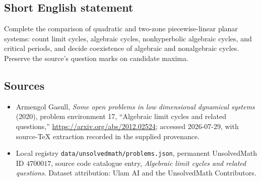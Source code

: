 \documentclass[11pt]{article}
\begin{document}
\subsection{Short English statement}
Complete the comparison of quadratic and two-zone piecewise-linear planar systems: count limit cycles, algebraic cycles, nonhyperbolic algebraic cycles, and critical periods, and decide coexistence of algebraic and nonalgebraic cycles. Preserve the source's question marks on candidate maxima.
\subsection{Sources}
\begin{itemize}
\item Armengol Gasull, \emph{Some open problems in low dimensional dynamical systems} (2020), problem environment 17, ``Algebraic limit cycles and related questions,'' \url{https://arxiv.org/abs/2012.02524}; accessed 2026-07-29, with source-TeX extraction recorded in the supplied provenance.
\item Local registry \texttt{data/unsolvedmath/problems.json}, permanent UnsolvedMath ID $4700017$, source code catalogue entry, \emph{Algebraic limit cycles and related questions}. Dataset attribution: Ulam AI and the UnsolvedMath Contributors.
\end{itemize}
\end{document}
